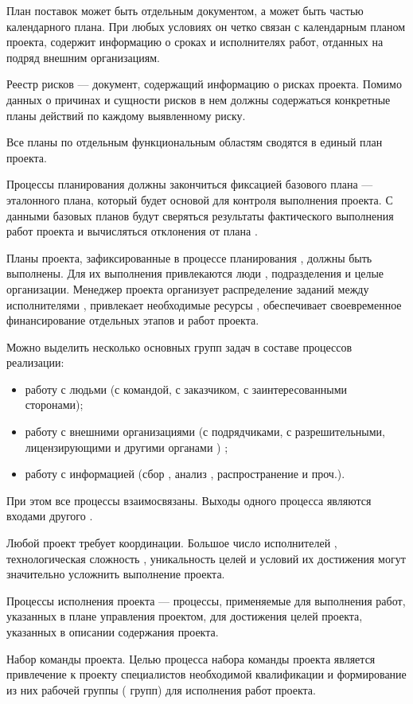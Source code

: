 План поставок может быть отдельным документом, а может быть частью календарного плана.
При любых условиях он четко связан с календарным планом проекта, содержит информацию о сроках и ис­полнителях работ, отданных на подряд внешним организациям.

Реестр рисков --- документ, содержащий информацию о рисках проекта.
Помимо данных о причинах и сущности рисков в нем долж­ны содержаться конкретные планы действий по каждому выявленно­му риску.

Все планы по отдельным функциональным областям сводятся в единый план проекта.

Процессы планирования должны закончиться фиксацией базово­го плана --- эталонного плана, который будет основой для контро­ля выполнения проекта.
С данными базовых планов будут сверяться результаты фактического выполнения работ проекта и вычисляться отклонения от плана \cite[174--175]{polkovnikov}.

Планы проекта, зафиксированные в процессе планирования , должны быть выполнены.
Для их выполнения привлекаются люди , подразде­ления и целые организации.
Менеджер проекта организует распре­деление заданий между исполнителями , привлекает необходимые ре­сурсы , обеспечивает своевременное финансирование отдельных этапов и работ проекта.

Можно выделить несколько основных групп задач в составе про­цессов реализации:
\begin{itemize}
	\item работу с людьми (с командой, с заказчиком, с заинтересованными сторонами);
	\item работу с внешними организациями (с подрядчиками, с разреши­тельными, лицензирующими и другими органами ) ;
	\item работу с информацией (сбор , анализ , распространение и проч.).
\end{itemize}

При этом все процессы взаимосвязаны.
Выходы одного процесса являются входами другого .

Любой проект требует координации.
Большое число исполнителей , технологическая сложность , уникальность целей и условий их дости­жения могут значительно усложнить выполнение проекта.


Процессы исполнения проекта --- процессы, применяемые для выполнения работ, указанных в плане управления проектом, для достижения целей проекта, указанных в описании содержания проекта.

Набор команды проекта.
Целью процесса набора команды проекта является привлечение к проекту специалистов необходимой квалификации и формирование из них рабочей группы ( групп) для исполнения работ проекта.

